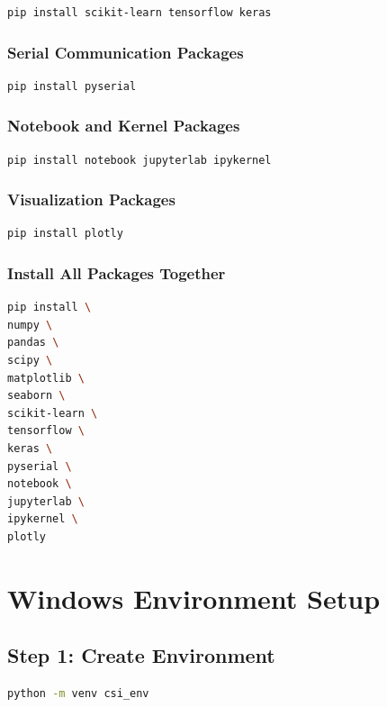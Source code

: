 \documentclass[12pt,a4paper]{article}
\begin{document}
\begin{lstlisting}[language=bash]
pip install scikit-learn tensorflow keras
\end{lstlisting}

\subsubsection{Serial Communication Packages}

\begin{lstlisting}[language=bash]
pip install pyserial
\end{lstlisting}

\subsubsection{Notebook and Kernel Packages}

\begin{lstlisting}[language=bash]
pip install notebook jupyterlab ipykernel
\end{lstlisting}

\subsubsection{Visualization Packages}

\begin{lstlisting}[language=bash]
pip install plotly
\end{lstlisting}

\subsubsection{Install All Packages Together}

\begin{lstlisting}[language=bash]
pip install \
numpy \
pandas \
scipy \
matplotlib \
seaborn \
scikit-learn \
tensorflow \
keras \
pyserial \
notebook \
jupyterlab \
ipykernel \
plotly
\end{lstlisting}

\section{Windows Environment Setup}

\subsection{Step 1: Create Environment}

\begin{lstlisting}[language=bash]
python -m venv csi_env
\end{lstlisting}
\end{document}
